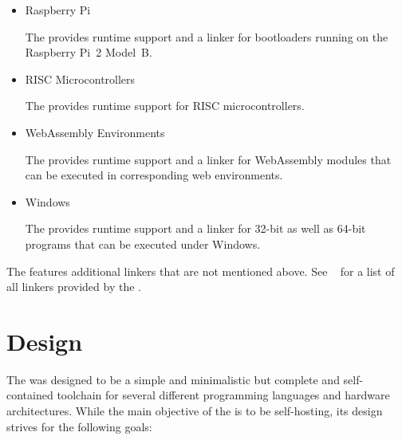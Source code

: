 \begin{itemize}
\item Raspberry Pi\nopagebreak

The \ecs{} provides runtime support and a linker for bootloaders running on the Raspberry Pi~2 Model~B.

\item RISC Microcontrollers\nopagebreak

The \ecs{} provides runtime support for RISC microcontrollers.

\item WebAssembly Environments\nopagebreak

The \ecs{} provides runtime support and a linker for WebAssembly modules that can be executed in corresponding web environments.

\item Windows\nopagebreak

The \ecs{} provides runtime support and a linker for 32-bit as well as 64-bit programs that can be executed under Windows.

\end{itemize}

The \ecs{} features additional linkers that are not mentioned above.
See \Documentation{}~ for a list of all linkers provided by the \ecs{}.

\section{Design}

The \ecs{} was designed to be a simple and minimalistic but complete and self-contained toolchain for several different programming languages and hardware architectures.
While the main objective of the \ecs{} is to be self-hosting, its design strives for the following goals:

